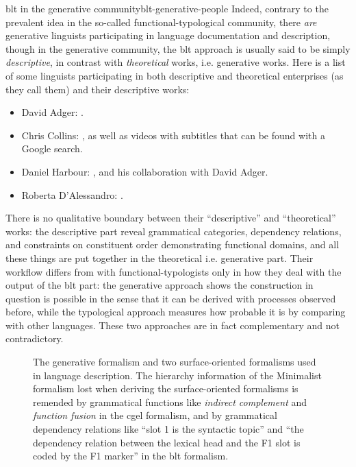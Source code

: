 \documentclass[UTF8, a4paper, oneside, scheme=plain]{ctexart}
\newcommand*{\term}[1]{\emph{#1}}
\begin{document}
\begin{infobox}{\ac{blt} in the generative community}{blt-generative-people}
    Indeed, contrary to the prevalent idea in the so-called functional-typological community,
    there \emph{are} generative linguists participating in language documentation and description,
    though in the generative community, 
    the \ac{blt} approach is usually said to be simply \emph{descriptive},
    in contrast with \emph{theoretical} works, i.e. generative works.
    Here is a list of some linguists participating in 
    both descriptive and theoretical enterprises (as they call them)
    and their descriptive works:
    \begin{itemize}
        \item David Adger: \citet{adger1997vso,adger2006dialect,harbour2012information}.
        \item Chris Collins: \citet{collins2014plural,miller2007sounds}, 
        as well as videos with subtitles that can be found with a Google search.
        \item Daniel Harbour: \citet{watkins2010linguistic}, and his collaboration with David Adger.
        \item Roberta D'Alessandro: \citet{andriani2022documenting,frasson2021subject}.
    \end{itemize}
    There is no qualitative boundary between their ``descriptive'' and ``theoretical'' works:
    the descriptive part reveal grammatical categories, dependency relations,
    and constraints on constituent order demonstrating functional domains,
    and all these things are put together in the theoretical i.e. generative part.
    Their workflow differs from with functional-typologists only in 
    how they deal with the output of the \ac{blt} part:
    the generative approach shows the construction in question is possible 
    in the sense that it can be derived with processes observed before,
    while the typological approach measures how probable it is 
    by comparing with other languages.
    These two approaches are in fact complementary and not contradictory.
\end{infobox}

\begin{figure}
    \centering
    
    \caption{The generative formalism and two surface-oriented formalisms used in language description.
    The hierarchy information of the Minimalist formalism lost when deriving the surface-oriented formalisms 
    is remended by grammatical functions 
    like \term{indirect complement} and \term{function fusion} in the \ac{cgel} formalism,
    and by grammatical dependency relations like ``slot 1 is the syntactic topic''
    and ``the dependency relation between the lexical head and the F1 slot is coded by the F1 marker'' 
    in the \ac{blt} formalism.}
    \label{fig:three-formalism}
\end{figure}
\end{document}
